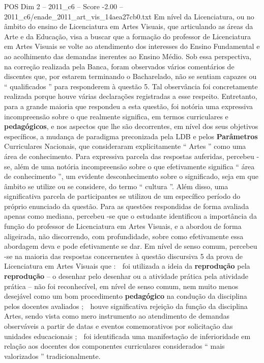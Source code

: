 \begin{textsample}{POS Dim 2 – 2011\_c6 – Score -2.00 – 2011\_c6/enade\_2011\_art\_vis\_14aea27cb0.txt}
Em nível da Licenciatura, ou no âmbito do ensino de Licenciatura em Artes Visuais, que articulando as áreas da Arte e da Educação, visa a buscar que a formação do professor de Licenciatura em Artes Visuais se volte ao atendimento dos interesses do Ensino Fundamental e ao acolhimento das demandas inerentes ao Ensino Médio.
Sob essa perspectiva, na correção realizada pela Banca, foram observados vários comentários de discentes que, por estarem terminando o Bacharelado, não se sentiam capazes ou “ qualificados ” para responderem à questão 5.
Tal observância foi concretamente realizada porque houve várias declarações registradas a esse respeito.
Entretanto, para a grande maioria que respondeu a esta questão, foi notória uma expressiva incompreensão sobre o que realmente significa, em termos curriculares e \textbf{pedagógicos}, e nos aspectos que lhe são decorrentes, em nível dos seus objetivos específicos, a mudança de paradigma preconizada pela LDB e pelos \textbf{Parâmetros} Curriculares Nacionais, que consideraram explicitamente “ Artes ” como uma área de conhecimento.
Para expressiva parcela das respostas auferidas, percebeu -se, além de uma notória incompreensão sobre o que efetivamente significa “ área de conhecimento ”, um evidente desconhecimento sobre o significado, seja em que âmbito se utilize ou se considere, do termo “ cultura ”.
Além disso, uma significativa parcela de participantes se utilizou de um específico período do próprio enunciado da questão.
Para as questões respondidas de forma avaliada apenas como mediana, percebeu -se que o estudante identificou a importância da função do professor de Licenciatura em Artes Visuais, e a abordou de forma aligeirada, não discorrendo, com profundidade, sobre como efetivamente essa abordagem deva e pode efetivamente se dar.
Em nível de senso comum, percebeu -se na maioria das respostas concernentes à questão discursiva 5 da prova de Licenciatura em Artes Visuais que :  foi utilizada a ideia da \textbf{reprodução} pela \textbf{reprodução} – o desenhar pelo desenhar ou a atividade prática pela atividade prática – não foi reconhecível, em nível de senso comum, nem muito menos desejável como um bom procedimento \textbf{pedagógico} na condução da disciplina pelos docentes avaliados ;  houve significativa rejeição da função da disciplina Artes, sendo vista como mero instrumento ao atendimento de demandas observáveis a partir de datas e eventos comemorativos por solicitação das unidades educacionais ;  foi identificada uma manifestação de inferioridade em relação aos docentes dos componentes curriculares considerados “ mais valorizados ” tradicionalmente.

\end{textsample}
